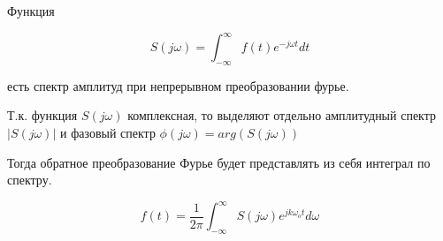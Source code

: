 Функция 

\begin{equation}
S(j \omega) = \int_{-\infty}^{\infty}f(t) e^{-j \omega t} dt
\end{equation}

есть спектр амплитуд при непрерывном преобразовании фурье.

Т.к. функция $ S(j \omega) $ комплексная, то выделяют отдельно амплитудный спектр $ |S(j \omega)| $ и фазовый спектр $ \phi(j \omega)=arg(S(j \omega)) $

Тогда обратное преобразование Фурье будет представлять из себя интеграл по спектру.

\begin{equation}
f(t) = \frac{1}{2\pi}\int_{-\infty}^{\infty}S(j \omega)e^{j k \omega_o t} d \omega
\end{equation}

\pagebreak